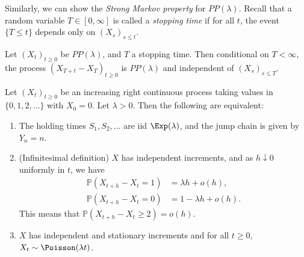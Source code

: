 \documentclass[12pt]{article}
\begin{document}
Similarly, we can show the \emph{Strong Markov property} for $PP(\lambda)$. Recall that a random variable $T \in [0, \infty]$ is called a \emph{stopping time} if for all $t$, the event $\{T \leq t\}$ depends only on $(X_s)_{s \leq t}$.

\begin{theorem}
	Let $(X_t)_{t \geq 0}$ be $PP(\lambda)$, and $T$ a stopping time. Then conditional on $T < \infty$, the process $(X_{T+t} - X_T)_{t \geq 0}$ is $PP(\lambda)$ and independent of $(X_s)_{s \leq T}$.
\end{theorem}

\begin{theorem}
	Let $(X_t)_{t \geq 0}$ be an increasing right continuous process taking values in $\{0, 1, 2, \ldots\}$ with $X_0 = 0$. Let $\lambda > 0$. Then the following are equivalent:
	\begin{enumerate}[\normalfont(a)]
		\item The holding times $S_1, S_2, \ldots$ are iid $\Exp(\lambda)$, and the jump chain is given by $Y_n = n$.
		\item (Infinitesimal definition) $X$ has independent increments, and as $h \downarrow 0$ uniformly in $t$, we have
			\begin{align*}
				\mathbb{P}(X_{t+h} - X_t = 1) &= \lambda h + o(h), \\
				\mathbb{P}(X_{t+h} - X_t = 0) &= 1 - \lambda h + o(h).
			\end{align*}
			This means that $\mathbb{P}(X_{t+h} - X_t \geq 2) = o(h)$.
		\item $X$ has independent and stationary increments and for all $t \geq 0$, $X_t \sim \Poisson(\lambda t)$.
	\end{enumerate}
\end{theorem}
\end{document}

